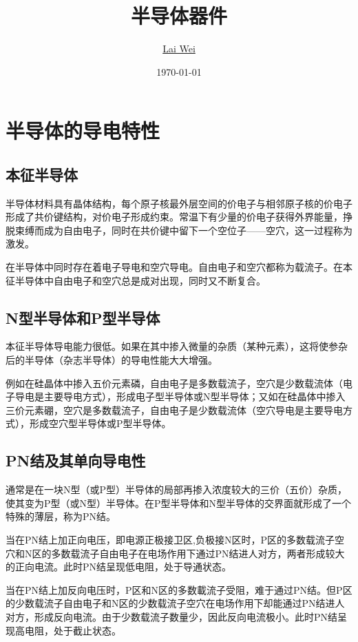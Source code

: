 \documentclass[12pt]{article}
\title{半导体器件}
\author{\href{mailto:lai-wei@whu.edu.cn}{Lai Wei}}
\date{\today}
\begin{document}
\maketitle

\section{半导体的导电特性}

\subsection{本征半导体}

半导体材料具有晶体结构，每个原子核最外层空间的价电子与相邻原子核的价电子形成了共价键结构，对价电子形成约束。常温下有少量的价电子获得外界能量，挣脱束缚而成为自由电子，同时在共价键中留下一个空位子——空穴，这一过程称为激发。

在半导体中同时存在着电子导电和空穴导电。自由电子和空穴都称为载流子。在本征半导体中自由电子和空穴总是成对出现，同时又不断复合。

\subsection{N型半导体和P型半导体}

本征半导体导电能力很低。如果在其中掺入微量的杂质（某种元素），这将使参杂后的半导体（杂志半导体）的导电性能大大增强。

例如在硅晶体中掺入五价元素磷，自由电子是多数载流子，空穴是少数载流体（电子导电是主要导电方式），形成电子型半导体或N型半导体；又如在硅晶体中掺入三价元素硼，空穴是多数载流子，自由电子是少数载流体（空穴导电是主要导电方式），形成空穴型半导体或P型半导体。

\subsection{PN结及其单向导电性}

通常是在一块N型（或P型）半导体的局部再掺入浓度较大的三价（五价）杂质，使其变为P型（或N型）半导体。在P型半导体和N型半导体的交界面就形成了一个特殊的薄层，称为PN结。

当在PN结上加正向电压，即电源正极接卫区,负极接N区时，P区的多数载流子空穴和N区的多数载流子自由电子在电场作用下通过PN结进人对方，两者形成较大的正向电流。此时PN结呈现低电阻，处于导通状态。

当在PN结上加反向电压时，P区和N区的多数載流子受阻，难于通过PN结。但P区的少数载流子自由电子和N区的少数载流子空穴在电场作用下却能通过PN结进人对方，形成反向电流。由于少数载流子数量少，因此反向电流极小。此时PN结呈现高电阻，处于截止状态。
\end{document}
